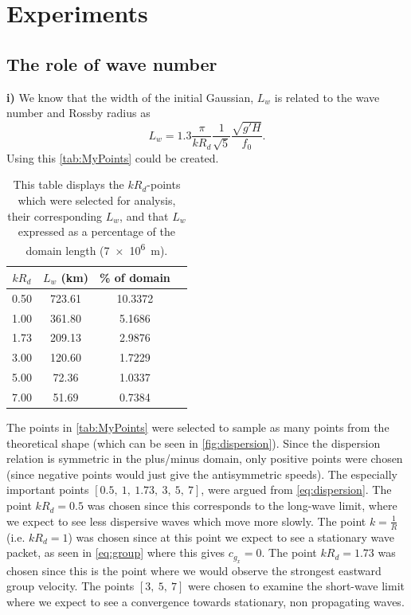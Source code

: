 \section{Experiments}
\subsection{The role of wave number}

\textbf{i)} We know that the width of the initial Gaussian, $L_w$ is related to the wave number and Rossby radius as 
$$L_w=1.3\frac{\pi}{kR_d}\frac{1}{\sqrt{5}}\frac{\sqrt{g\prime H}}{f_0}.$$
Using this \autoref{tab:MyPoints} could be created.

\begin{table}[h]
\centering
\begin{tabular}{c c c c}
\hline
$kR_d$ & $L_w$ (km) & \% of domain \\
\hline
0.50 & 723.61 & 10.3372 \\
1.00 & 361.80 & 5.1686 \\
1.73 & 209.13 & 2.9876 \\
3.00 & 120.60 & 1.7229 \\
5.00 & 72.36 & 1.0337 \\
7.00 & 51.69 & 0.7384 \\
\hline
\end{tabular}
\caption{This table displays the $kR_d$-points which were selected for analysis, their corresponding $L_w$, and that $L_w$ expressed as a percentage of the domain length (\SI{7e6}{\meter}).}
\label{tab:MyPoints}
\end{table}

The points in \autoref{tab:MyPoints} were selected to sample as many points from the theoretical shape (which can be seen in \autoref{fig:dispersion}). Since the dispersion relation is symmetric in the plus/minus domain, only positive points were chosen (since negative points would just give the antisymmetric speeds). The especially important points $[0.5,\ 1,\ 1.73,\ 3, \ 5, \ 7]$, were argued from \autoref{eq:dispersion}. The point $kR_d=0.5$ was chosen since this corresponds to the long-wave limit, where we expect to see less dispersive waves which move more slowly. The point $k=\tfrac{1}{R}$ (i.e. $kR_d=1$) was chosen since at this point we expect to see a stationary wave packet, as seen in \autoref{eq:group} where this gives $c_{g_x}=0$. The point $kR_d=1.73$ was chosen since this is the point where we would observe the strongest eastward group velocity. The points $[3, \ 5, \ 7]$ were chosen to examine the short-wave limit where we expect to see a convergence towards stationary, non propagating waves. 

